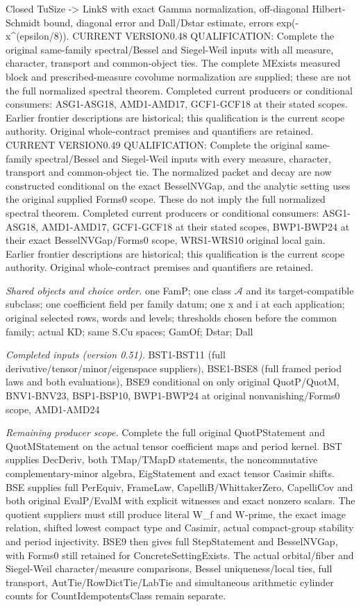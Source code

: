 \documentclass[11pt,a4paper]{article}
\numberwithin{equation}{section}
\theoremstyle{remark}\newtheorem{remark}[theorem]{Remark}
\begin{document}
Closed TuSize -> LinkS with exact Gamma normalization, off-diagonal Hilbert-Schmidt bound, diagonal error and Dall/Dstar estimate, errors exp(-x\textasciicircum{}(epsilon/8)). CURRENT VERSION0.48 QUALIFICATION: Complete the original same-family spectral/Bessel and Siegel-Weil inputs with all measure, character, transport and common-object ties. The complete MExists measured block and prescribed-measure covolume normalization are supplied; these are not the full normalized spectral theorem. Completed current producers or conditional consumers: ASG1-ASG18, AMD1-AMD17, GCF1-GCF18 at their stated scopes. Earlier frontier descriptions are historical; this qualification is the current scope authority. Original whole-contract premises and quantifiers are retained. CURRENT VERSION0.49 QUALIFICATION: Complete the original same-family spectral/Bessel and Siegel-Weil inputs with every measure, character, transport and common-object tie. The normalized packet and decay are now constructed conditional on the exact BesselNVGap, and the analytic setting uses the original supplied Forms0 scope. These do not imply the full normalized spectral theorem. Completed current producers or conditional consumers: ASG1-ASG18, AMD1-AMD17, GCF1-GCF18 at their stated scopes, BWP1-BWP24 at their exact BesselNVGap/Forms0 scope, WRS1-WRS10 original local gain. Earlier frontier descriptions are historical; this qualification is the current scope authority. Original whole-contract premises and quantifiers are retained.

\emph{Shared objects and choice order.} one FamP; one class $\mathcal A$ and its target-compatible subclass; one coefficient field per family datum; one x and i at each application; original selected rows, words and levels; thresholds chosen before the common family; actual KD; same S.Cu spaces; GamOf; Dstar; Dall

\emph{Completed inputs (version 0.51).} BST1-BST11 (full derivative/tensor/minor/eigenspace suppliers), BSE1-BSE8 (full framed period laws and both evaluations), BSE9 conditional on only original QuotP/QuotM, BNV1-BNV23, BSP1-BSP10, BWP1-BWP24 at original nonvanishing/Forms0 scope, AMD1-AMD24

\emph{Remaining producer scope.} Complete the full original QuotPStatement and QuotMStatement on the actual tensor coefficient maps and period kernel. BST supplies DecDeriv, both TMap/TMapD statements, the noncommutative complementary-minor algebra, EigStatement and exact tensor Casimir shifts. BSE supplies full PerEquiv, FrameLaw, CapelliB/WhittakerZero, CapelliCov and both original EvalP/EvalM with explicit witnesses and exact nonzero scalars. The quotient suppliers must still produce literal W\_\allowbreak f and W-prime, the exact image relation, shifted lowest compact type and Casimir, actual compact-group stability and period injectivity. BSE9 then gives full StepStatement and BesselNVGap, with Forms0 still retained for ConcreteSettingExists. The actual orbital/fiber and Siegel-Weil character/measure comparisons, Bessel uniqueness/local ties, full transport, AutTie/RowDictTie/LabTie and simultaneous arithmetic cylinder counts for CountIdempotentsClass remain separate.
\end{document}
